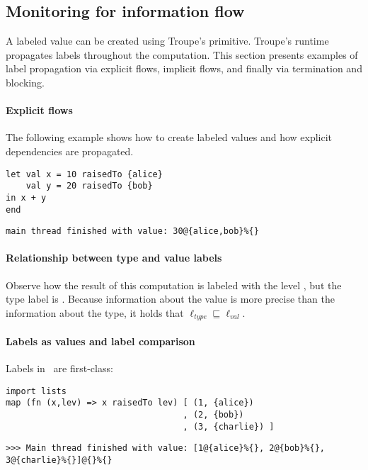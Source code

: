 \subsection{Monitoring for information flow}
A labeled value can be created using Troupe's 
primitive. Troupe's runtime propagates labels throughout the computation.
This section presents examples of label propagation via explicit flows, implicit flows, and
finally via termination and blocking.


\paragraph{Explicit flows}
The following example shows how to create labeled values and how explicit dependencies are propagated.
\begin{lstlisting}
let val x = 10 raisedTo {alice}
    val y = 20 raisedTo {bob}
in x + y
end
\end{lstlisting}
\begin{verbatim}
main thread finished with value: 30@{alice,bob}%{}
\end{verbatim}



\paragraph{Relationship between type and value labels}
Observe how the result of this computation is labeled with 
the level , but the type label is \lev{}.
Because information about the value is more precise than the information about the type, it holds that 
$\ell_{\mathit{type}} \sqsubseteq \ell_{\mathit{val}}$. 



\paragraph{Labels as values and label comparison}
Labels in \troupelang\ are first-class:

\begin{lstlisting}
import lists
map (fn (x,lev) => x raisedTo lev) [ (1, {alice})
                                   , (2, {bob})
                                   , (3, {charlie}) ]
\end{lstlisting}
\begin{lstlisting}
>>> Main thread finished with value: [1@{alice}%{}, 2@{bob}%{}, 
3@{charlie}%{}]@{}%{}    
\end{lstlisting}
